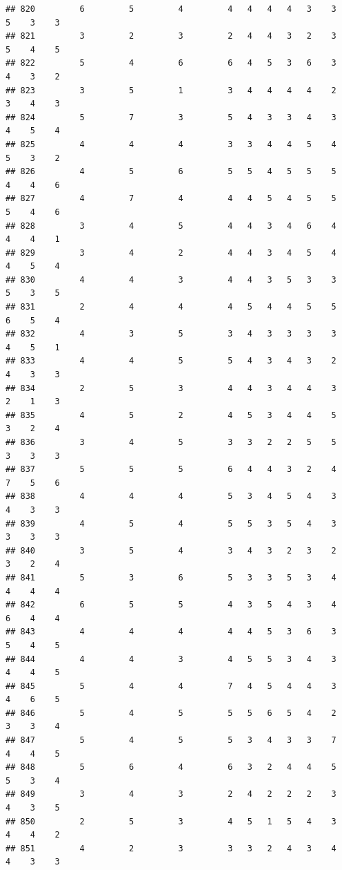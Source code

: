 \documentclass[
]{article}
\begin{document}
\begin{verbatim}
## 820         6         5         4         4   4   4   4   3    3    5    3    3
## 821         3         2         3         2   4   4   3   2    3    5    4    5
## 822         5         4         6         6   4   5   3   6    3    4    3    2
## 823         3         5         1         3   4   4   4   4    2    3    4    3
## 824         5         7         3         5   4   3   3   4    3    4    5    4
## 825         4         4         4         3   3   4   4   5    4    5    3    2
## 826         4         5         6         5   5   4   5   5    5    4    4    6
## 827         4         7         4         4   4   5   4   5    5    5    4    6
## 828         3         4         5         4   4   3   4   6    4    4    4    1
## 829         3         4         2         4   4   3   4   5    4    4    5    4
## 830         4         4         3         4   4   3   5   3    3    5    3    5
## 831         2         4         4         4   5   4   4   5    5    6    5    4
## 832         4         3         5         3   4   3   3   3    3    4    5    1
## 833         4         4         5         5   4   3   4   3    2    4    3    3
## 834         2         5         3         4   4   3   4   4    3    2    1    3
## 835         4         5         2         4   5   3   4   4    5    3    2    4
## 836         3         4         5         3   3   2   2   5    5    3    3    3
## 837         5         5         5         6   4   4   3   2    4    7    5    6
## 838         4         4         4         5   3   4   5   4    3    4    3    3
## 839         4         5         4         5   5   3   5   4    3    3    3    3
## 840         3         5         4         3   4   3   2   3    2    3    2    4
## 841         5         3         6         5   3   3   5   3    4    4    4    4
## 842         6         5         5         4   3   5   4   3    4    6    4    4
## 843         4         4         4         4   4   5   3   6    3    5    4    5
## 844         4         4         3         4   5   5   3   4    3    4    4    5
## 845         5         4         4         7   4   5   4   4    3    4    6    5
## 846         5         4         5         5   5   6   5   4    2    3    3    4
## 847         5         4         5         5   3   4   3   3    7    4    4    5
## 848         5         6         4         6   3   2   4   4    5    5    3    4
## 849         3         4         3         2   4   2   2   2    3    4    3    5
## 850         2         5         3         4   5   1   5   4    3    4    4    2
## 851         4         2         3         3   3   2   4   3    4    4    3    3

\end{verbatim}
\end{document}
